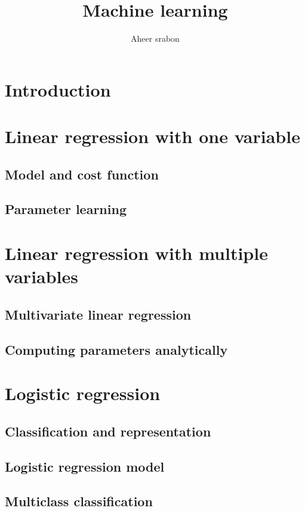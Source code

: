 

\title{Machine learning}
\author{Aheer srabon}


\maketitle

	\section{Introduction}

	\section{Linear regression with one variable}
	\subsection{Model and cost function}
	\subsection{Parameter learning}

	\section{Linear regression with multiple variables}
	\subsection{Multivariate linear regression}
	\subsection{Computing parameters analytically}

	\section{Logistic regression}
	\subsection{Classification and representation}
	\subsection{Logistic regression model}
	\subsection{Multiclass classification}

